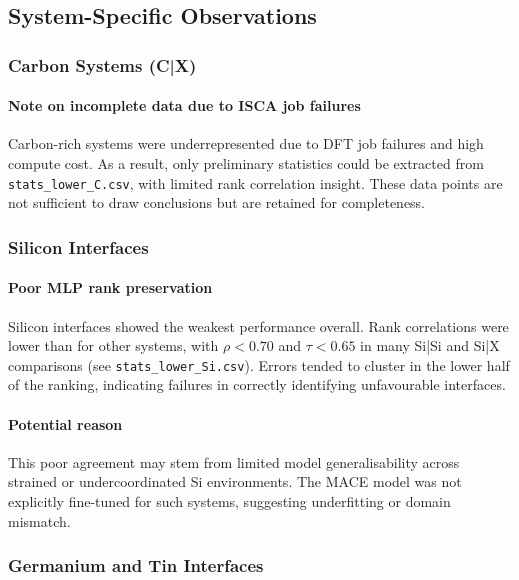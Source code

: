 \subsection{System-Specific Observations}

\subsubsection{Carbon Systems (C|X)}

\paragraph{Note on incomplete data due to ISCA job failures}

Carbon-rich systems were underrepresented due to DFT job failures and high compute cost. As a result, only preliminary statistics could be extracted from \texttt{stats\_lower\_C.csv}, with limited rank correlation insight. These data points are not sufficient to draw conclusions but are retained for completeness.

\subsubsection{Silicon Interfaces}

\paragraph{Poor MLP rank preservation}

Silicon interfaces showed the weakest performance overall. Rank correlations were lower than for other systems, with $\rho < 0.70$ and $\tau < 0.65$ in many Si|Si and Si|X comparisons (see \texttt{stats\_lower\_Si.csv}). Errors tended to cluster in the lower half of the ranking, indicating failures in correctly identifying unfavourable interfaces.

\paragraph{Potential reason}

This poor agreement may stem from limited model generalisability across strained or undercoordinated Si environments. The MACE model was not explicitly fine-tuned for such systems, suggesting underfitting or domain mismatch.

\subsubsection{Germanium and Tin Interfaces}

